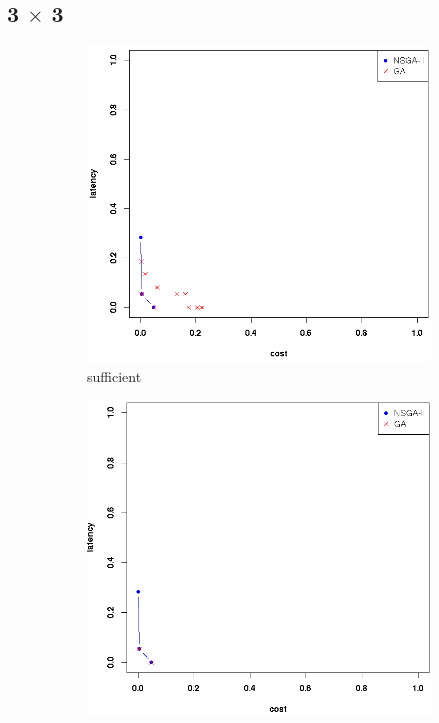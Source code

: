 \documentclass{llncs}
\begin{document}
\subsection{3 $\times$ 3}
\label{sec:comparison}
\begin{figure}[H]
	\centering
	\begin{subfigure}[b]{0.3\textwidth}
		\includegraphics[width=\textwidth]{pics/pop_50_gen_50_3_times_3_suff.png}
		\caption{sufficient}
	\end{subfigure}%
	\begin{subfigure}[b]{0.3\textwidth}
		\includegraphics[width=\textwidth]{pics/pop_50_gen_50_3_times_3_minimum.png}

\end{subfigure}
\end{figure}
\end{document}
